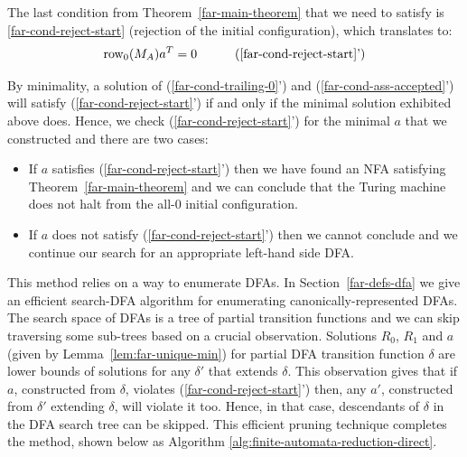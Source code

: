 The last condition from Theorem~\ref{far-main-theorem} that we need to satisfy is \eqref{far-cond-reject-start} (rejection of the initial configuration), which translates to:
\begin{align}
  \row_0 (M_A) a\T & =0
                      & \tag{\ref{far-cond-reject-start}'}
\end{align}

By minimality, a solution of (\ref{far-cond-trailing-0}') and (\ref{far-cond-ass-accepted}') will satisfy (\ref{far-cond-reject-start}') if and only if the minimal solution exhibited above does. Hence, we check (\ref{far-cond-reject-start}') for the minimal $a$ that we constructed and there are two cases:

\begin{itemize}
  \item If $a$ satisfies (\ref{far-cond-reject-start}') then we have found an NFA satisfying Theorem~\ref{far-main-theorem} and we can conclude that the Turing machine does not halt from the all-0 initial configuration.
  \item If $a$ does not satisfy (\ref{far-cond-reject-start}') then we cannot conclude and we continue our search for an appropriate left-hand side DFA.
\end{itemize}

This method relies on a way to enumerate DFAs. In Section~\ref{far-defs-dfa} we give an efficient {\sc search-DFA} algorithm for enumerating canonically-represented DFAs. The search space of DFAs is a tree of partial transition functions and we can skip traversing some sub-trees based on a crucial observation. Solutions $R_0$, $R_1$ and $a$ (given by Lemma~\ref{lem:far-unique-min}) for partial DFA transition function $\delta$ are lower bounds of solutions for any $\delta'$ that extends $\delta$. This observation gives that if $a$, constructed from $\delta$, violates (\ref{far-cond-reject-start}') then, any $a'$, constructed from $\delta'$ extending $\delta$, will violate it too. Hence, in that case, descendants of $\delta$ in the DFA search tree can be skipped.
This efficient pruning technique completes the method, shown below as Algorithm \ref{alg:finite-automata-reduction-direct}.


